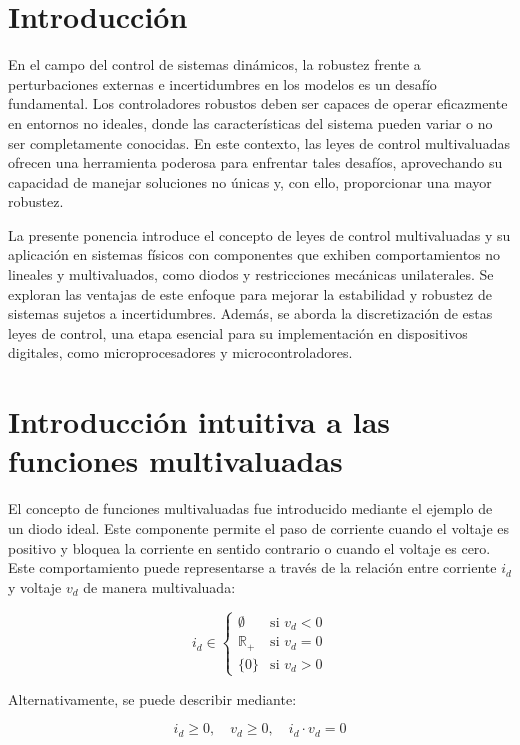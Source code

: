 \documentclass[conference]{IEEEtran}
\begin{document}
\section{Introducción}
En el campo del control de sistemas dinámicos, la robustez frente a perturbaciones externas e incertidumbres en los modelos es un desafío fundamental. Los controladores robustos deben ser capaces de operar eficazmente en entornos no ideales, donde las características del sistema pueden variar o no ser completamente conocidas. En este contexto, las leyes de control multivaluadas ofrecen una herramienta poderosa para enfrentar tales desafíos, aprovechando su capacidad de manejar soluciones no únicas y, con ello, proporcionar una mayor robustez.

La presente ponencia introduce el concepto de leyes de control multivaluadas y su aplicación en sistemas físicos con componentes que exhiben comportamientos no lineales y multivaluados, como diodos y restricciones mecánicas unilaterales. Se exploran las ventajas de este enfoque para mejorar la estabilidad y robustez de sistemas sujetos a incertidumbres. Además, se aborda la discretización de estas leyes de control, una etapa esencial para su implementación en dispositivos digitales, como microprocesadores y microcontroladores.

\section{Introducción intuitiva a las funciones multivaluadas}

El concepto de funciones multivaluadas fue introducido mediante el ejemplo de un diodo ideal. Este componente permite el paso de corriente cuando el voltaje es positivo y bloquea la corriente en sentido contrario o cuando el voltaje es cero. Este comportamiento puede representarse a través de la relación entre corriente \( i_d \) y voltaje \( v_d \) de manera multivaluada:

\begin{equation}
	i_d \in \begin{cases}
		\emptyset    & \text{si } v_d < 0 \\
		\mathbb{R}_+ & \text{si } v_d = 0 \\
		\{0\}        & \text{si } v_d > 0
	\end{cases}
\end{equation}

Alternativamente, se puede describir mediante:

\begin{equation}
	i_d \geq 0, \quad v_d \geq 0, \quad i_d \cdot v_d = 0
\end{equation}
\end{document}

